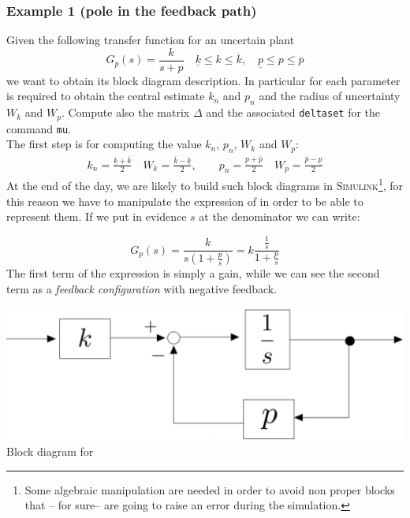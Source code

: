 \documentclass[a4paper, 12pt]{article}
\begin{document}
\subsubsection*{Example 1 (pole in the feedback path)}
Given the following transfer function for an uncertain plant 
\begin{equation}\label{eq:ex1}
    G_p(s)=\frac{k}{s+p} \quad  
    \underline{k}\le {k} \le \overline{k}, \quad
    \underline{p}\le {p} \le \overline{p}
\end{equation}
we want to obtain its block diagram description. In particular for each parameter is required to obtain the central estimate $k_n$ and $p_n$ and the radius of uncertainty $W_k$ and $W_p$. Compute also the matrix $\Delta$ and the associated \texttt{deltaset} for the command \texttt{mu}.\\
The first step is for computing the value $k_n$, $p_n$, $W_k$ and $W_p$:
\begin{align}
    k_n=\frac{\underline{k}+\overline{k}}{2} \quad
    W_k=\frac{\overline{k}-\underline{k}}{2}, \qquad 
    p_n=\frac{\underline{p}+\overline{p}}{2} \quad
    W_p=\frac{\overline{p}-\underline{p}}{2}
\end{align}
\noindent
At the end of the day, we are likely to build such block diagrams in \textsc{Simulink}\footnote{
    Some algebraic manipulation are needed in order to avoid non proper blocks that -- for sure-- are going to raise an error during the simulation.
}, for this reason we have to manipulate the expression of  in order to be able to represent them. If we put in evidence $s$ at the denominator we can write:

\begin{multicols}{2}
    {\large{
        \begin{equation*}
            G_p(s)=\frac{k}{s(1+\frac{p}{s})}=k \frac{\frac{1}{s}}{1+\frac{p}{s}}
        \end{equation*}
    }}
    The first term of the expression is simply a gain, while we can see the second term as a \textit{feedback configuration} with negative feedback.
    \newcolumn 
    \begin{center}
        \includegraphics[scale=0.15]{img/ex1.jpg}\\
        \textsf{Block diagram for }
    \end{center}
\end{multicols}
\end{document}
